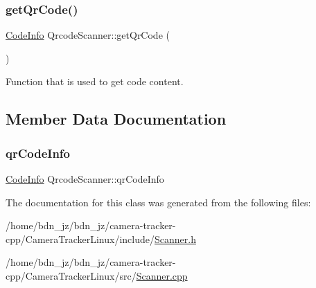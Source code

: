 \subsubsection{\texorpdfstring{get\+Qr\+Code()}{getQrCode()}}
{\footnotesize\ttfamily \hyperlink{struct_code_info}{Code\+Info} Qrcode\+Scanner\+::get\+Qr\+Code (\begin{DoxyParamCaption}{ }\end{DoxyParamCaption})}



Function that is used to get code content. 



\subsection{Member Data Documentation}
\mbox{\label{class_qrcode_scanner_af93303c867d09d136c94015610071c91}} 
\subsubsection{\texorpdfstring{qr\+Code\+Info}{qrCodeInfo}}
{\footnotesize\ttfamily \hyperlink{struct_code_info}{Code\+Info} Qrcode\+Scanner\+::qr\+Code\+Info\hspace{0.3cm}{\ttfamily [private]}}



The documentation for this class was generated from the following files\+:\begin{DoxyCompactItemize}
\item 
/home/bdn\+\_\+jz/bdn\+\_\+jz/camera-\/tracker-\/cpp/\+Camera\+Tracker\+Linux/include/\hyperlink{_scanner_8h}{Scanner.\+h}\item 
/home/bdn\+\_\+jz/bdn\+\_\+jz/camera-\/tracker-\/cpp/\+Camera\+Tracker\+Linux/src/\hyperlink{_scanner_8cpp}{Scanner.\+cpp}\end{DoxyCompactItemize}
